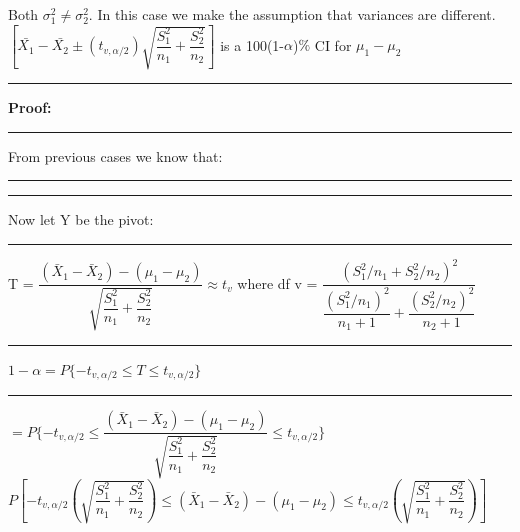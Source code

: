 \documentclass[]{article}
\begin{document}
\newline Both  $\sigma^2_1 \ne \sigma^2_2$. In this case we make the assumption that variances are different.
\newline
\newline
$\left[ \bar{X_{1}} - \bar{X_{2}} \pm \left( t_{v, \alpha / 2 }  \right) \sqrt{\dfrac{S^2_1}{n_1} + \dfrac{S^2_2}{n_2}    }      \right] $ is a 100(1-$\alpha$)$\%$ CI for $\mu_1 - \mu_2$ 
\newline 
\newline
\newline\Large\rule{3.0cm}{0pt} \textbf{Proof:}
\newline\Large\rule{3.0cm}{0pt} From previous cases we know that:
\newline\Large\rule{3.0cm}{0pt}     
\newline\newline\Large\rule{3.0cm}{0pt} Now let Y be the  pivot:
\newline\newline\Large\rule{3.0cm}{0pt} T = $\dfrac{  (  \bar{X}_1 - \bar{X}_2 )  -  (\mu_1 - \mu_2)   }{\sqrt{\dfrac{S^2_1}{n_1} + \dfrac{S^2_2}{n_2}}} \approx t_{v}$ 
where df
v = $\dfrac{  (  S^2_1 / n_1  + S^2_2 / n_2  )^2  }{  \dfrac{(S^2_1 / n_1)^2}{n_1 +1}   +  \dfrac{(S^2_2 / n_2)^2}{n_2 +1}    }$
\newline
\newline 
\newline\Large\rule{3.0cm}{0pt} $1 - \alpha = P \{ -t_{v, \alpha / 2} \le T \le t_{v, \alpha / 2} \}$ 
\newline
\newline
\newline\Large\rule{4.3cm}{0pt} $ = P \{ -t_{v, \alpha / 2} \le \dfrac{  (  \bar{X}_1 - \bar{X}_2 )  -  (\mu_1 - \mu_2)   }{\sqrt{\dfrac{S^2_1}{n_1} + \dfrac{S^2_2}{n_2}}}  \le t_{v, \alpha /2} \}$
\newline
\newline
\newline
$P \left[  -t_{v, \alpha / 2} \left( \sqrt{\dfrac{S^2_1}{n_1} + \dfrac{S^2_2}{n_2}} \right) \le  (  \bar{X}_1 - \bar{X}_2 )  -  (\mu_1 - \mu_2) \le t_{v, \alpha /2} \left( \sqrt{\dfrac{S^2_1}{n_1} + \dfrac{S^2_2}{n_2}} \right)  \right]$
\newline
\newline
\end{document}
